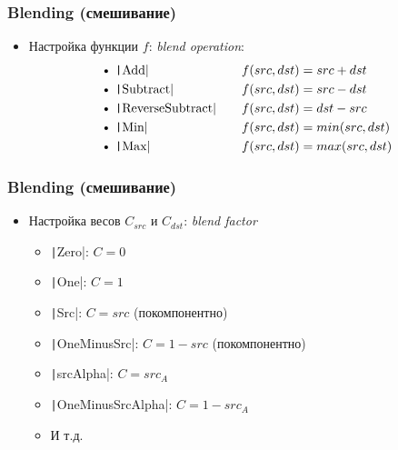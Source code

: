 \documentclass[10pt]{beamer}
\begin{document}
\begin{frame}[fragile]
\frametitle{Blending (смешивание)}
\begin{itemize}
\item Настройка функции \begin{math}f\end{math}: \textit{blend operation}:
\[
\begin{aligned}
&\text{\textbullet\ \texttt|Add|} \quad && f(src, dst) = src + dst \\
&\text{\textbullet\ \texttt|Subtract|} \quad && f(src, dst) = src - dst \\
&\text{\textbullet\ \texttt|ReverseSubtract|} \quad && f(src, dst) = dst - src \\
&\text{\textbullet\ \texttt|Min|} \quad && f(src, dst) = min(src, dst) \\
&\text{\textbullet\ \texttt|Max|} \quad && f(src, dst) = max(src, dst) \\
\end{aligned}
\]
\end{itemize}
\end{frame}

\begin{frame}[fragile]
\frametitle{Blending (смешивание)}
\begin{itemize}
\item Настройка весов \begin{math}C_{src}\end{math} и \begin{math}C_{dst}\end{math}: \textit{blend factor}
\begin{itemize}
\item \texttt|Zero|: \begin{math}C = 0\end{math}
\item \texttt|One|: \begin{math}C = 1\end{math}
\item \texttt|Src|: \begin{math}C = src\end{math} (покомпонентно)
\item \texttt|OneMinusSrc|: \begin{math}C = 1 - src\end{math} (покомпонентно)
\item \texttt|srcAlpha|: \begin{math}C = src_A\end{math}
\item \texttt|OneMinusSrcAlpha|: \begin{math}C = 1 - src_A\end{math}
\item И т.д.
\end{itemize}
\end{itemize}
\end{frame}
\end{document}
